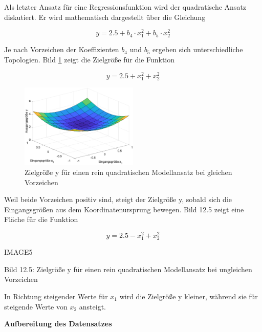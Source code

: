 \noindent Als letzter Ansatz f\"{u}r eine Regressionsfunktion wird der quadratische Ansatz diskutiert. Er wird mathematisch dargestellt \"{u}ber die Gleichung

\begin{equation}\label{eq:thirteentwentyfour}
y=2.5+b_{4} \cdot x_{1}^{2} +b_{5} \cdot x_{2}^{2}
\end{equation}

\noindent Je nach Vorzeichen der Koeffizienten $b_{4}$ und $b_{5}$ ergeben sich unterschiedliche Topologien. Bild \ref{fig:Funktionsansatz3} zeigt die Zielgr\"{o}{\ss}e f\"{u}r die Funktion

\begin{equation}\label{eq:thirteentwentyfive}
y=2.5+x_{1}^{2} +x_{2}^{2}
\end{equation}

\noindent 
\begin{figure}[H]
  \centerline{\includegraphics[width=0.5\textwidth]{Kapitel13/Bilder/image4}}
  \caption{Zielgr\"{o}{\ss}e y f\"{u}r einen rein quadratischen Modellansatz bei gleichen Vorzeichen}
  \label{fig:Funktionsansatz3}
\end{figure}

\noindent Weil beide Vorzeichen positiv sind, steigt der Zielgr\"{o}{\ss}e y, sobald sich die Eingangsgr\"{o}{\ss}en aus dem Koordinatenursprung bewegen. Bild 12.5 zeigt eine Fl\"{a}che f\"{u}r die Funktion

\begin{equation}\label{eq:thirteentwentysix}
y=2.5-x_{1}^{2} +x_{2}^{2}
\end{equation}

IMAGE5

\noindent Bild 12.5: Zielgr\"{o}{\ss}e y f\"{u}r einen rein quadratischen Modellansatz bei ungleichen Vorzeichen

\noindent In Richtung steigender Werte f\"{u}r $x_{1}$ wird die Zielgr\"{o}{\ss}e y kleiner, w\"{a}hrend sie f\"{u}r steigende Werte von $x_{2}$ ansteigt. \bigskip

{\selectfont
\noindent\textbf{Aufbereitung des Datensatzes}} \smallskip

